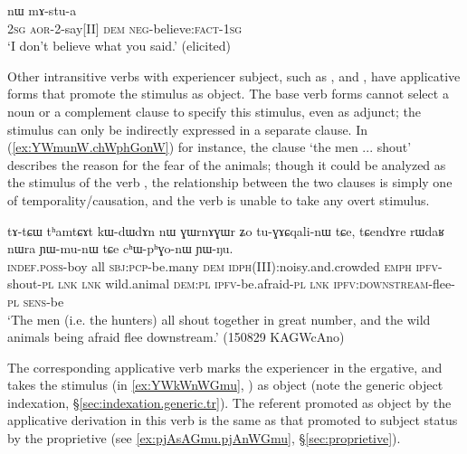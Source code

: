 \begin{exe}
\ex \label{ex:tAtWtWt.nW.mAstua}
 nɯ mɤ-stu-a \\
\textsc{2sg} \textsc{aor}-2-say[II] \textsc{dem} \textsc{neg}-believe:\textsc{fact}-\textsc{1sg} \\
\glt `I don't believe what you said.' (elicited)
\end{exe}

Other intransitive verbs with experiencer subject, such as ,  and , have applicative forms that promote the stimulus as object. The base verb forms cannot select a noun or a complement clause to specify this stimulus, even as adjunct; the stimulus can only be indirectly expressed in a separate clause. In (\ref{ex:YWmunW.chWphGonW}) for instance, the clause  `the men ... shout' describes the reason for the fear of the animals; though it could be analyzed as the stimulus of the verb , the relationship between the two clauses is simply one of temporality/causation, and the verb  is unable to take any overt stimulus.

\begin{exe}
\ex \label{ex:YWmunW.chWphGonW}
\gll  tɤ-tɕɯ tʰamtɕɤt kɯ-dɯ\redp{}dɤn nɯ ɣɯrnɤɣɯr ʑo tu-ɣɤɕqali-nɯ tɕe, tɕendɤre rɯdaʁ nɯra ɲɯ-mu-nɯ tɕe cʰɯ-pʰɣo-nɯ ɲɯ-ŋu. \\
\textsc{indef}.\textsc{poss}-boy all \textsc{sbj}:\textsc{pcp}-be.many \textsc{dem} \textsc{idph}(III):noisy.and.crowded \textsc{emph} \textsc{ipfv}-shout-\textsc{pl} \textsc{lnk} \textsc{lnk} wild.animal \textsc{dem}:\textsc{pl} \textsc{ipfv}-be.afraid-\textsc{pl} \textsc{lnk} \textsc{ipfv}:\textsc{downstream}-flee-\textsc{pl} \textsc{sens}-be \\
\glt `The men (i.e. the hunters) all shout together in great number, and the wild animals being afraid flee downstream.' (150829 KAGWcAno)
\end{exe}


The corresponding applicative verb  marks the experiencer in the ergative, and takes the stimulus (in \ref{ex:YWkWnWGmu}, ) as object (note the generic object indexation, §\ref{sec:indexation.generic.tr}). The referent promoted as object by the applicative derivation in this verb is the same as that promoted to subject status by the proprietive  (see \ref{ex:pjAsAGmu.pjAnWGmu}, §\ref{sec:proprietive}).

